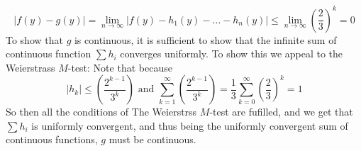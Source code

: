 \documentclass{article}
\begin{document}
\[
	|f(y) - g(y)| = \lim_{n \to \infty} |f(y) - h_1(y) - \ldots - h_n(y)| \leq \lim_{n \to \infty} \left( \frac{2}{3}\right)^k = 0
\]
To show that $g$ is continuous, it is sufficient to show that the infinite sum of continuous function $\sum h_i$ converges uniformly.  To show this we appeal to the Weierstrass $M$-test:  Note that because 
\[
	|h_k| \leq \left(\frac{2^{k-1}}{3^k}\right) \mbox{ and } \sum_{k=1}^\infty \left(\frac{2^{k-1}}{3^k}\right)  = \frac{1}{3} \sum_{k=0}^\infty \left(\frac{2}{3}\right)^k = 1
\]
So then all the conditions of The Weierstrss $M$-test are fufilled, and we get that $\sum h_i$ is uniformly convergent, and thus being the uniformly convergent sum of continuous functions, $g$ must be continuous.
\end{document}

